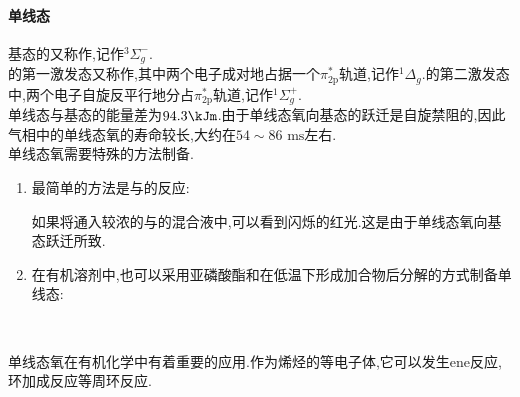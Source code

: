 \documentclass{ctexart}
\begin{document}
\paragraph{单线态}
基态的又称作,记作$^3\Sigma_g^-$.\\
\indent {}的第一激发态又称作,其中两个电子成对地占据一个$\pi_{2\text{p}}^\ast$轨道,记作$^1\Delta_g$.的第二激发态中,两个电子自旋反平行地分占$\pi_{2\text{p}}^\ast$轨道,记作$^1\Sigma_g^+$.\\
\indent 单线态与基态的能量差为$94.3\kJm$.由于单线态氧向基态的跃迁是自旋禁阻的,因此气相中的单线态氧的寿命较长,大约在$54\sim86\text{ ms}$左右.\\
\indent 单线态氧需要特殊的方法制备.
\begin{enumerate}[label=\tbf{\arabic*},topsep=0pt,parsep=0pt,itemsep=0pt,partopsep=0pt]
    \item 最简单的方法是与的反应:
        \begin{center}
        \end{center}
        如果将通入较浓的与的混合液中,可以看到闪烁的红光.这是由于单线态氧向基态跃迁所致.
    \item 在有机溶剂中,也可以采用亚磷酸酯和在低温下形成加合物后分解的方式制备单线态:
        \begin{center}
            \\
        \end{center}
\end{enumerate}

\indent 单线态氧在有机化学中有着重要的应用.作为烯烃的等电子体,它可以发生ene反应,环加成反应等周环反应.
\end{document}
